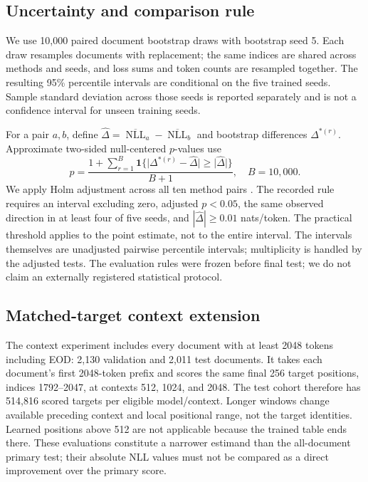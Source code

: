 \documentclass[conference]{IEEEtran}
\newcommand{\nll}{\operatorname{NLL}}
\begin{document}
\subsection{Uncertainty and comparison rule}
We use 10,000 paired document bootstrap draws with bootstrap seed 5. Each draw resamples documents with replacement; the same indices are shared across methods and seeds, and loss sums and token counts are resampled together. The resulting 95\% percentile intervals are conditional on the five trained seeds. Sample standard deviation across those seeds is reported separately and is not a confidence interval for unseen training seeds.

For a pair $a,b$, define $\widehat\Delta=\overline{\nll}_a-\overline{\nll}_b$ and bootstrap differences $\Delta^{*(r)}$. Approximate two-sided null-centered $p$-values use
\begin{equation}
p=\frac{1+\sum_{r=1}^{B}\mathbf{1}\{\lvert\Delta^{*(r)}-\widehat\Delta\rvert\geq\lvert\widehat\Delta\rvert\}}{B+1},\quad B=10,000.
\end{equation}
We apply Holm adjustment across all ten method pairs \cite{holm}. The recorded rule requires an interval excluding zero, adjusted $p<0.05$, the same observed direction in at least four of five seeds, and $|\widehat\Delta|\geq0.01$ nats/token. The practical threshold applies to the point estimate, not to the entire interval. The intervals themselves are unadjusted pairwise percentile intervals; multiplicity is handled by the adjusted tests. The evaluation rules were frozen before final test; we do not claim an externally registered statistical protocol.

\subsection{Matched-target context extension}
The context experiment includes every document with at least 2048 tokens including EOD: 2,130 validation and 2,011 test documents. It takes each document's first 2048-token prefix and scores the same final 256 target positions, indices 1792--2047, at contexts 512, 1024, and 2048. The test cohort therefore has 514,816 scored targets per eligible model/context. Longer windows change available preceding context and local positional range, not the target identities. Learned positions above 512 are not applicable because the trained table ends there. These evaluations constitute a narrower estimand than the all-document primary test; their absolute NLL values must not be compared as a direct improvement over the primary score.
\end{document}
